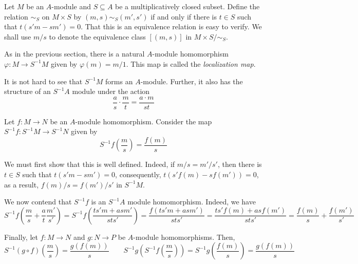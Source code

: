 Let $M$ be an $A$-module and $S\subseteq A$ be a multiplicatively closed subset. Define the relation $\sim_S$ on $M\times S$ by $(m,s)\sim_S(m',s')$ if and only if there is $t\in S$ such that $t(s'm - sm') = 0$. That this is an equivalence relation is easy to verify. We shall use $m/s$ to denote the equivalence class $[(m,s)]$ in $M\times S/\sim_S$.

As in the previous section, there is a natural $A$-module homomorphism $\varphi: M\to S^{-1}M$ given by $\varphi(m) = m/1$. This map is called the \textit{localization map}.

It is not hard to see that $S^{-1}M$ forms an $A$-module. Further, it also has the structure of an $S^{-1}A$ module under the action 
\begin{equation*}
    \frac{a}{s}\cdot\frac{m}{t} = \frac{a\cdot m}{st}
\end{equation*}

Let $f: M\to N$ be an $A$-module homomorphism. Consider the map $S^{-1}f: S^{-1}M\to S^{-1}N$ given by 
\begin{equation*}
    S^{-1}f\left(\frac{m}{s}\right) = \frac{f(m)}{s}
\end{equation*}

We must first show that this is well defined. Indeed, if $m/s = m'/s'$, then there is $t\in S$ such that $t(s'm - sm') = 0$, consequently, $t(s'f(m) - sf(m')) = 0$, as a result, $f(m)/s = f(m')/s'$ in $S^{-1}M$. 

We now contend that $S^{-1}f$ is an $S^{-1}A$ module homomorphism. Indeed, we have 
\begin{equation*}
    S^{-1}f\left(\frac{m}{s} + \frac{a}{t}\frac{m'}{s'}\right) = S^{-1}f\left(\frac{ts' m + as m'}{sts'}\right) = \frac{f(ts'm + asm')}{sts'} = \frac{ts'f(m) + asf(m')}{sts'} = \frac{f(m)}{s} + \frac{f(m')}{s'}
\end{equation*}

Finally, let $f: M\to N$ and $g: N\to P$ be $A$-module homomorphisms. Then, 
\begin{equation*}
    S^{-1}(g\circ f)\left(\frac{m}{s}\right) = \frac{g(f(m))}{s}\qquad S^{-1}g\left(S^{-1}f\left(\frac{m}{s}\right)\right) = S^{-1}g\left(\frac{f(m)}{s}\right) = \frac{g(f(m))}{s}
\end{equation*}

